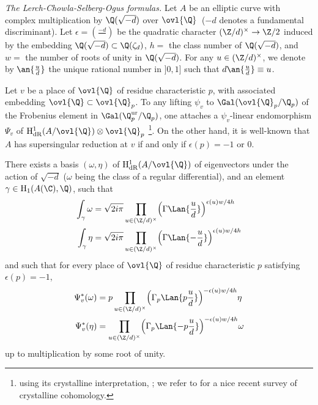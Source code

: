 \begin{para} {\itshape The Lerch-Chowla-Selberg-Ogus formulas.}
 \label{para-lerch-chowla}
 Let $A$ be an elliptic curve with complex multiplication by
 ${\Q}(\sqrt{-d})$ over ${\ovl{\Q}}\,$ ($-d$ denotes a fundamental
 discriminant).  Let $\epsilon = (\frac{-d}{}) $ be the quadratic
 character $({\Z}/d)^\times\to {\Z}/2$ induced by the embedding
${\Q}(\sqrt{-d})\subset {\Q}(\zeta_d) $, $h=$ the class number of
 ${\Q}(\sqrt{-d})$, and $w=$ the 
 number of roots of unity in ${\Q}(\sqrt{-d})$.  For any $u\in
 ({\Z}/d)^{\times}$, we denote by $\an{\frac{u}{d}}$ the unique rational
 number in $]0,1]$ such that $d\an{\frac{u}{d}}\equiv u$.

 Let $v$ be a place of ${\ovl{\Q}}$ of residue characteristic $p$, with
 associated embedding ${\ovl{\Q}}\subset {\ovl{\Q}}_p$.  To any lifting
 $\psi_v$ to $\Gal({\ovl{\Q}}_p/{\Q}_p)$ of the Frobenius element in
 $\Gal({\Q}_p^{\mathrm{ur}}/{\Q}_p)$, one attaches a $\psi_v$-linear
 endomorphism $\Psi_v$ of
 $\mathrm{H}^1_{\mathrm{dR}}(A/{\ovl{\Q}})\otimes {\ovl{\Q}}_p$
 \footnote{using its crystalline interpretation, \cf \cite[4]{fadrc1};
 we refer to \cite{chambert98:_cohom} for a nice recent survey of crystalline
 cohomology.}.
 On the other hand, it is well-known that $A$ has supersingular
 reduction at $v$ if and only if $\epsilon(p)=-1$ or $0$.
\end{para} 

\begin{thm}\label{thm-ogus-formula}
 There exists a basis $(\omega, \eta)$ of
 $\mathrm{H}^1_{\mathrm{dR}}(A/{\ovl{\Q}})$ of eigenvectors under the
 action of $\sqrt{-d}$ ($\omega$ being the class of a regular
 differential), and an element $\gamma \in \mathrm{H}_1(A(\C),{\Q})$,
 such that
 \begin{align*}
  \int_{\gamma} \omega
  & = \sqrt{2i\pi}\prod_{u\in ({\Z}/d)^{\times}}
  \Bigl(\Gamma\Lan{\frac{u}{d}}\Bigr)^{\epsilon(u)w/4h} \\
  \int_{\gamma} \eta 
  & = \sqrt{2i\pi}\prod_{u\in({\Z}/d)^{\times}}
  \Bigl(\Gamma\Lan{-\frac{u}{d}}\Bigr)^{\epsilon(u)w/4h}
 \end{align*}
 and such that for every place of ${\ovl{\Q}}$
 of residue characteristic $p$ satisfying $\epsilon (p)=-1$,
 \begin{align*}
  \Psi_v^{\ast} (\omega)
  & = p\prod_{u\in ({\Z}/d)^{\times}}
  \Bigl(\Gamma_p\Lan{p\frac{u}{d}}\Bigr)^{-\epsilon(u)w/4h}\eta \\
  \Psi_v^{\ast} (\eta)
  & = \prod_{u\in ({\Z}/d)^{\times}}
  \Bigl(\Gamma_p\Lan{-p\frac{u}{d}}\Bigr)^{-\epsilon(u)w/4h}\omega
 \end{align*}
 up to multiplication by some root of unity.
\end{thm}

